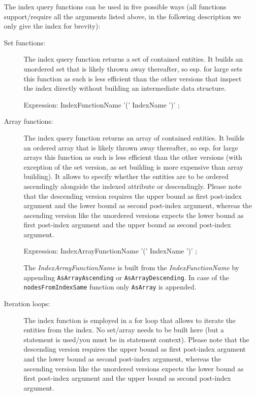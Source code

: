 The index query functions can be used in five possible ways (all functions support/require all the arguments listed above, in the following description we only give the index for brevity): 
\begin{description}
	\item[Set functions:] The index query function returns a set of contained entities. It builds an unordered set that is likely thrown away thereafter, so esp. for large sets this function as such is less efficient than the other versions that inspect the index directly without building an intermediate data structure.
\begin{rail}
Expression:
  IndexFunctionName '(' IndexName ')' ;
\end{rail}

	\item[Array functions:] The index query function returns an array of contained entities. It builds an ordered array that is likely thrown away thereafter, so esp. for large arrays this function as such is less efficient than the other versions (with exception of the set version, as set building is more expensive than array building). It allows to specify whether the entities are to be ordered ascendingly alongside the indexed attribute or descendingly.
Please note that the descending version requires the upper bound as first post-index argument and the lower bound as second post-index argument, whereas the ascending version like the unordered versions expects the lower bound as first post-index argument and the upper bound as second post-index argument.
\begin{rail}
Expression:
  IndexArrayFunctionName '(' IndexName ')' ;
\end{rail}
The \emph{IndexArrayFunctionName} is built from the \emph{IndexFunctionName} by appending \texttt{AsArrayAscending} or \texttt{AsArrayDescending}.
In case of the \texttt{nodesFromIndexSame} function only \texttt{AsArray} is appended.

	\item[Iteration loops:] The index function is employed in a for loop that allows to iterate the entities from the index. No set/array needs to be built here (but a statement is used/you must be in statement context).
Please note that the descending version requires the upper bound as first post-index argument and the lower bound as second post-index argument, whereas the ascending version like the unordered versions expects the lower bound as first post-index argument and the upper bound as second post-index argument.


\end{description}
